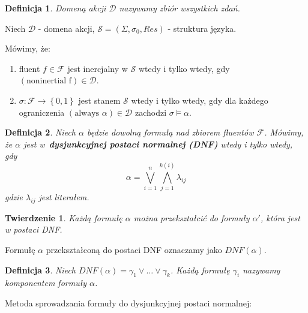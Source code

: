 \documentclass[11pt,a4paper]{article}
\newtheorem{defn}{Definicja}
\newtheorem{theorem}{Twierdzenie}
\begin{document}
\begin{defn}
Domeną akcji $\mathcal{D}$ nazywamy zbiór wszystkich zdań.
\end{defn}

Niech $\mathcal{D}$ - domena akcji, $\mathcal{S} = \left(\Sigma, \sigma_0, Res\right)$ - struktura języka.

Mówimy, że:
\begin{enumerate}
    \item fluent $f \in \mathcal{F}$  jest inercjalny w $\mathcal{S}$ wtedy i tylko wtedy, gdy $\left(\text{noninertial f}\right) \in \mathcal{D}$.
    \item $\sigma : \mathcal{F} \rightarrow \left\{0,1\right\}$ jest stanem $\mathcal{S}$ wtedy i tylko wtedy, gdy dla każdego ograniczenia $\left(\text{always } \alpha\right) \in \mathcal{D}$ zachodzi $\sigma \models \alpha$.
\end{enumerate}



\begin{defn}
Niech $\alpha$ będzie dowolną formułą nad zbiorem fluentów $\mathcal{F}$. Mówimy, że $\alpha$ jest w~\textbf{dysjunkcyjnej postaci normalnej (DNF)} wtedy i tylko wtedy, gdy 
$$\alpha = \bigvee_{i=1}^{n} \bigwedge_{j=1}^{k(i)} \lambda_{ij}$$
gdzie $\lambda_{ij}$ jest literałem.
\end{defn}

\begin{theorem}
Każdą formułę $\alpha$ można przekształcić do formuły $\alpha'$, która jest w postaci DNF.
\end{theorem}

Formułę $\alpha$ przekształconą do postaci DNF oznaczamy jako $DNF(\alpha)$.

\begin{defn}
Niech $DNF(\alpha) = \gamma_1 \vee \dots \vee \gamma_k$. Każdą formułę $\gamma_i$ nazywamy komponentem formuły $\alpha$.
\end{defn}

Metoda sprowadzania formuły do dysjunkcyjnej postaci normalnej:
\end{document}

